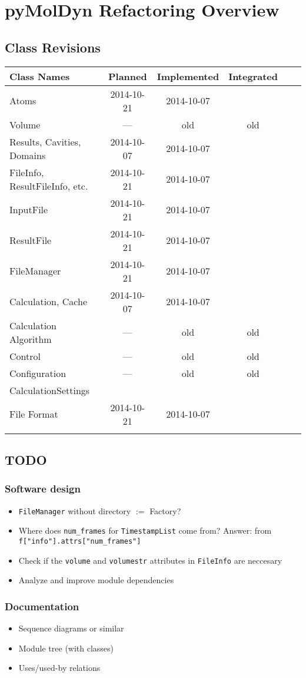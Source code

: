 \documentclass[final, oneside, a4paper, 11pt, pdftex, english]{scrreprt}
\begin{document}
\chapter*{pyMolDyn Refactoring Overview}
\section*{Class Revisions}

\begin{tabular}{|l|c|c|c|c|c|}
    \hline
    \textbf{Class Names} & \textbf{Planned} & \textbf{Implemented} & \textbf{Integrated} \\
    \hline
    Atoms & 2014-10-21 & 2014-10-07 & \\
    \hline
    Volume & --- & old & old \\
    \hline
    Results, Cavities, Domains & 2014-10-07 & 2014-10-07 & \\
    \hline
    FileInfo, ResultFileInfo, etc. & 2014-10-21 & 2014-10-07 & \\
    \hline
    InputFile & 2014-10-21 & 2014-10-07 & \\
    \hline
    ResultFile & 2014-10-21 & 2014-10-07 & \\
    \hline
    FileManager & 2014-10-21 & 2014-10-07 & \\
    \hline
    Calculation, Cache & 2014-10-07 & 2014-10-07 & \\
    \hline
    Calculation Algorithm & --- & old & old \\
    \hline
    Control & --- & old & old \\
    \hline
    Configuration & --- & old & old \\
    \hline
    CalculationSettings & & & \\
    \hline
    File Format & 2014-10-21 & 2014-10-07 & \\
    \hline
    & & & \\
    \hline
\end{tabular}


\section*{TODO}
\subsection*{Software design}
\begin{itemize}
    \item \texttt{FileManager} without directory $:=$ Factory?
    \item Where does \texttt{num\_frames} for \texttt{TimestampList} come from? Answer: from \texttt{f["info"].attrs["num\_frames"]}
    \item Check if the \texttt{volume} and \texttt{volumestr} attributes in \texttt{FileInfo} are neccesary
    \item Analyze and improve module dependencies
\end{itemize}


\subsection*{Documentation}
\begin{itemize}
    \item Sequence diagrams or similar
    \item Module tree (with classes)
    \item Uses/used-by relations
\end{itemize}
\end{document}
